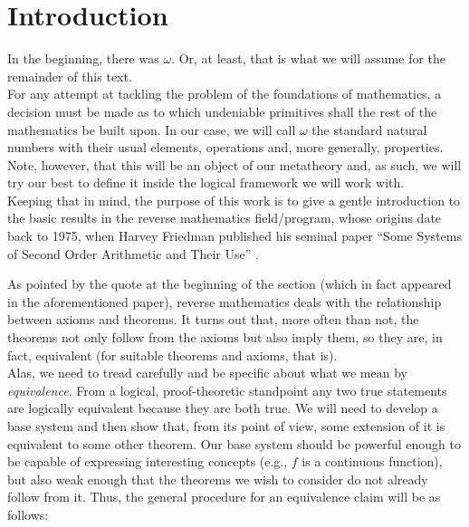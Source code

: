 \documentclass[../main.tex]{book}
\begin{document}
\chapter{Introduction}


In the beginning, there was $\omega$. Or, at least, that is what we will assume for the remainder of this text. \\

For any attempt at tackling the problem of the foundations of mathematics, a decision must be made as to which undeniable primitives shall the rest of the mathematics be built upon. In our case, we will call $\omega$ the standard natural numbers with their usual elements, operations and, more generally, properties. Note, however, that this will be an object of our metatheory and, as such, we will try our best to define it inside the logical framework we will work with. \\

Keeping that in mind, the purpose of this work is to give a gentle introduction to the basic results in the reverse mathematics field/program, whose origins date back to 1975, when Harvey Friedman published his seminal paper ``Some Systems of Second Order Arithmetic and Their Use'' \cite{friedman}.

As pointed by the quote at the beginning of the section (which in fact appeared in the aforementioned paper), reverse mathematics deals with the relationship between axioms and theorems. It turns out that, more often than not, the theorems not only follow from the axioms but also imply them, so they are, in fact, equivalent (for suitable theorems and axioms, that is). \\

Alas, we need to tread carefully and be specific about what we mean by \textit{equivalence}. From a logical, proof-theoretic standpoint any two true statements are logically equivalent because they are both true. We will need to develop a base system and then show that, from its point of view, some extension of it is equivalent to some other theorem. Our base system should be powerful enough to be capable of expressing interesting concepts (e.g., $f$ is a continuous function), but also weak enough that the theorems we wish to consider do not already follow from it. Thus, the general procedure for an equivalence claim will be as follows: \\
\end{document}
